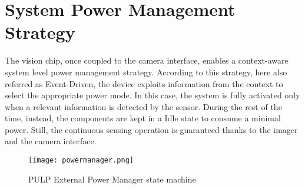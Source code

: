\documentclass[journal]{IEEEtran}
\begin{document}
\begin{table}[]
\caption{Power consumption of the system components}	\label{tab:power}

\centering
{}
\end{table}



\section{System Power Management Strategy}
\label{sec:Prot}
The vision chip, once coupled to the camera interface, enables a context-aware system level power management strategy. 
According to this strategy, here also referred as Event-Driven, 
the device exploits information from the context to select the appropriate power mode.
In this case, the system is fully activated only when a relevant information is detected by the sensor. During the rest of the time, instead, the components are kept in a Idle state to consume a minimal power. Still, the continuous sensing operation is guaranteed thanks to the imager and the camera interface.

\begin{figure}[b]
	\centering
  	\texttt{[image: powermanager.png]}
	\caption{PULP External Power Manager state machine}
	\label{fig:fsm}       %
\end{figure}
\end{document}

